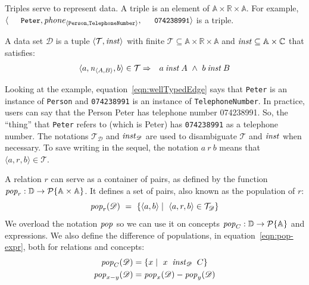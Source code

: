 \documentclass[runningheads]{llncs}
\newcommand{\id}[1]{\text{\it #1\/}}
\newcommand{\popF}[1]{\id{pop}_{#1}}
\newcommand{\pop}[2]{\popF{#1}(#2)}
\newcommand{\instance}{\mathbin{\id{inst}}}
\newcommand{\powerset}[1]{\cal{P}\{#1\}}
\newcommand{\declare}[3]{\id{#1}_{\pair{#2}{#3}}}
\newcommand{\pair}[2]{\langle{#1},{#2}\rangle}
\newcommand{\Pair}[2]{#1\times#2}
\newcommand{\triple}[3]{\langle{#1},{#2},{#3}\rangle}
\newcommand{\atom}[1]{{\tt\small #1}}
\newcommand{\Atoms}{\mathbb{A}}
\newcommand{\Concepts}{\mathbb{C}}
\newcommand{\Rels}{\mathbb{R}}   %
\newcommand{\triples}{\mathcal{T}}
\newcommand{\Triple}[3]{#1\times#2\times#3}
\newcommand{\dataset}{\mathscr{D}}
\newcommand{\Dataset}{\mathbb{D}}
\begin{document}
   Triples serve to represent data.
   A triple %
   is an element of $\Triple{\Atoms}{\Rels}{\Atoms}$.
   For example, $\triple{\text{\atom{Peter}}}{\declare{\id{phone}}{\tt Person}{\tt TelephoneNumber}}{\text{\atom{074238991}}}$ is a triple.
   
   \begin{definition}
   A data set $\dataset$ is a tuple $\pair{\triples}{\instance}$ with finite $\triples \subseteq {\Triple{\Atoms}{\Rels}{\Atoms}}$ and $\instance \subseteq  {\Pair{\Atoms}{\Concepts}}$ that satisfies:
\begin{eqnarray}
   \triple{a}{\declare{n}{A}{B}}{b}\in\triples&\Rightarrow&a\instance A\ \wedge\ b\instance B
   \label{eqn:wellTypedEdge}
\end{eqnarray}
\end{definition}
   Looking at the example,
   equation~\ref{eqn:wellTypedEdge} says that \atom{Peter} is an instance of {\tt Person} and \atom{074238991} is an instance of {\tt TelephoneNumber}.
   In practice, users can say that the Person Peter has telephone number 074238991.
   So, the ``thing'' that \atom{Peter} refers to (which is Peter) has \atom{074238991} as a telephone number.
   The notations $\triples_{\dataset}$ and $\instance_{\dataset}$ are used to disambiguate $\triples$ and $\instance$ when necessary.
   To save writing in the sequel, the notation $a\ r\ b$ means that $\triple{a}{r}{b}\in\triples$.

   A relation $r$ can serve as a container of pairs,
   as defined by the function $\popF{r}:\Dataset\rightarrow\powerset{\Pair{\Atoms}{\Atoms}}$.
   It defines a set of pairs, also known as the population of $r$:
\begin{equation}
   \pop{r}{\dataset}\ =\ \{ \pair{a}{b}\mid\ \triple{a}{r}{b}\in\triples_{\dataset}\}
\label{eqn:pop-rel}
\end{equation}
%
   We overload the notation $\popF{}$ so we can use it on concepts $\popF{C}:\Dataset\rightarrow\powerset{\Atoms}$
   and expressions. We also define the difference of populations, in equation~\ref{eqn:pop-expr}, both for relations and concepts:
\begin{align}
   \pop{C}{\dataset}&= \{ x\mid\ x\ \instance_{\dataset}\ C\}
\label{eqn:pop-concept}\\
   \pop{x-y}{\dataset}&= \pop{x}{\dataset} - \pop{y}{\dataset}
\label{eqn:pop-expr}
\end{align}
\end{document}
